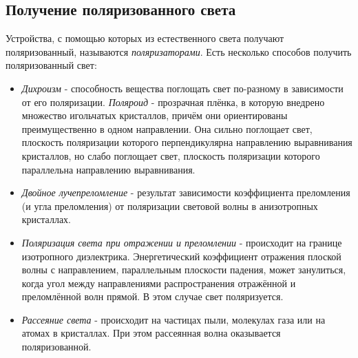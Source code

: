 \subsection*{Получение поляризованного света}
Устройства, с помощью которых из естественного света получают
поляризованный, называются \textit{поляризаторами}. Есть несколько способов получить поляризованный свет:
\begin{itemize}
\item \textit{Дихроизм} -  способность вещества поглощать свет по-разному в зависимости от его поляризации. \textit{Поляроид} - прозрачная плёнка, в которую внедрено множество игольчатых кристаллов, причём они ориентированы преимущественно в одном направлении. Она сильно поглощает свет, плоскость поляризации которого перпендикулярна направлению выравнивания кристаллов, но слабо поглощает свет, плоскость поляризации которого параллельна направлению выравнивания.
\item \textit{Двойное лучепреломление} - результат зависимости коэффициента преломления (и угла преломления) от поляризации световой волны в анизотропных кристаллах.
\item \textit{Поляризация света при отражении и преломлении} - происходит на границе изотропного диэлектрика. Энергетический коэффициент отражения плоской волны с направлением, параллельным плоскости падения, может занулиться, когда угол между направлениями распространения отражённой и преломлённой волн прямой. В этом случае свет поляризуется.
\item \textit{Рассеяние света} - происходит на частицах пыли, молекулах газа или на атомах в кристаллах. При этом рассеянная волна оказывается поляризованной.
\end{itemize}

